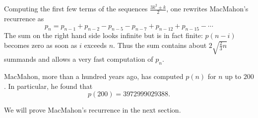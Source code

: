 

\setcounter{section}{3}
\setcounter{subsection}{8}
\setcounter{dfn}{19}


Computing the first few terms of the sequences $\frac{3k^2 \pm k}2$, one rewrites MacMahon's recurrence as
\[
p_n = p_{n-1} + p_{n-2} - p_{n-5} - p_{n-7} + p_{n-12} + p_{n-15} - \cdots
\]
The sum on the right hand side looks infinite but is in fact finite: $p(n-i)$ becomes zero as soon as $i$ exceeds $n$.
Thus the sum contains about $2\sqrt{\frac{2}{3} n}$ summands and allows a very fast computation of $p_n$.

MacMahon, more than a hundred years ago, has computed $p(n)$ for $n$ up to $200$.
In particular, he found that
\[
p(200) = 3 972 999 029 388.
\]

We will prove MacMahon's recurrence in the next section.




